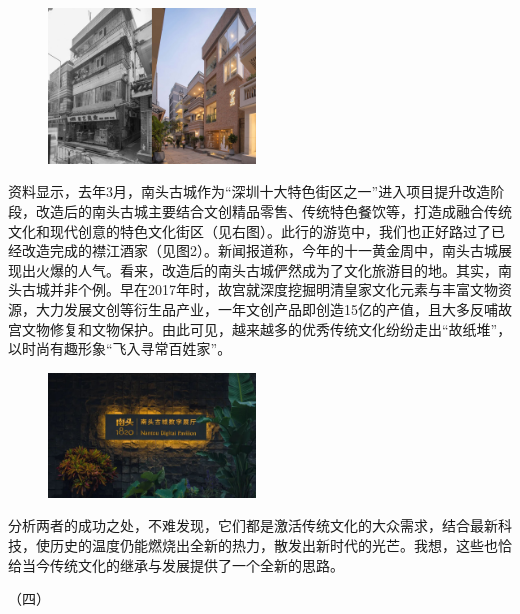 \documentclass[UTF8]{ctexart}
\begin{document}
\begingroup
\setlength{\intextsep}{0pt}
\setlength{\columnsep}{15pt}

\begin{figure}
  \centering
  \includegraphics[width=5.5cm]{imgs/reform.jpg}
\end{figure}
资料显示，去年3月，南头古城作为“深圳十大特色街区之一”进入项目提升改造阶段，改造后的南头古城主要结合文创精品零售、传统特色餐饮等，打造成融合传统文化和现代创意的特色文化街区（见右图）。此行的游览中，我们也正好路过了已经改造完成的襟江酒家（见图2）。新闻报道称，今年的十一黄金周中，南头古城展现出火爆的人气。看来，改造后的南头古城俨然成为了文化旅游目的地。其实，南头古城并非个例。早在2017年时，故宫就深度挖掘明清皇家文化元素与丰富文物资源，大力发展文创等衍生品产业，一年文创产品即创造15亿的产值，且大多反哺故宫文物修复和文物保护。由此可见，越来越多的优秀传统文化纷纷走出“故纸堆”，以时尚有趣形象“飞入寻常百姓家”。

\begin{figure}
    \centering
    \includegraphics[width=5.5cm]{imgs/digital.jpeg}
  \end{figure}

分析两者的成功之处，不难发现，它们都是激活传统文化的大众需求，结合最新科技，使历史的温度仍能燃烧出全新的热力，散发出新时代的光芒。我想，这些也恰给当今传统文化的继承与发展提供了一个全新的思路。

\endgroup
\begin{center}
    （四）
\end{center}
\end{document}
